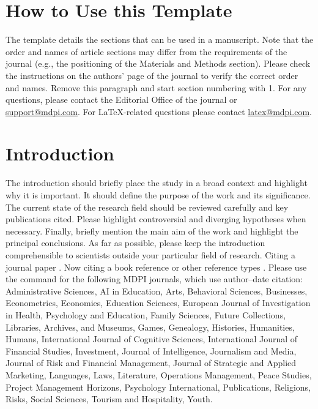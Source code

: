 ﻿\documentclass[journal,article,submit,moreauthors]{Definitions/mdpi}
\begin{document}
\setcounter{section}{-1}
\section{How to Use this Template}
The template details the sections that can be used in a manuscript. Note that the order and names of article sections may differ from the requirements of the journal (e.g., the positioning of the Materials and Methods section). Please check the instructions on the authors' page of the journal to verify the correct order and names. 
Remove this paragraph and start section numbering with 1. For any questions, please contact the Editorial Office of the journal or \href{mailto:support@mdpi.com}{support@mdpi.com}. For LaTeX-related questions please contact \href{mailto:latex@mdpi.com}{latex@mdpi.com}.
\section{Introduction}
The introduction should briefly place the study in a broad context and highlight why it is important. It should define the purpose of the work and its significance. The current state of the research field should be reviewed carefully and key publications cited. Please highlight controversial and diverging hypotheses when necessary. Finally, briefly mention the main aim of the work and highlight the principal conclusions. As far as possible, please keep the introduction comprehensible to scientists outside your particular field of research. Citing a journal paper \citep{ref-journal}.  Now citing a book reference \citep{ref-book1,ref-book2} or other reference types \citep{ref-unpublish,ref-url}. Please use the command \citep{ref-proceeding,ref-thesis} for the following MDPI journals, which use author--date citation: Administrative Sciences, AI in Education, Arts, Behavioral Sciences, Businesses, Econometrics, Economies, Education Sciences, European Journal of Investigation in Health, Psychology and Education, Family Sciences, Future Collections, Libraries, Archives, and Museums, Games, Genealogy, Histories, Humanities, Humans, International Journal of Cognitive Sciences, International Journal of Financial Studies, Investment, Journal of Intelligence, Journalism and Media, Journal of Risk and Financial Management, Journal of Strategic and Applied Marketing, Languages, Laws, Literature, Operations Management, Peace Studies, Project Management Horizons, Psychology International, Publications, Religions, Risks, Social Sciences, Tourism and Hospitality, Youth. 
\end{document}
